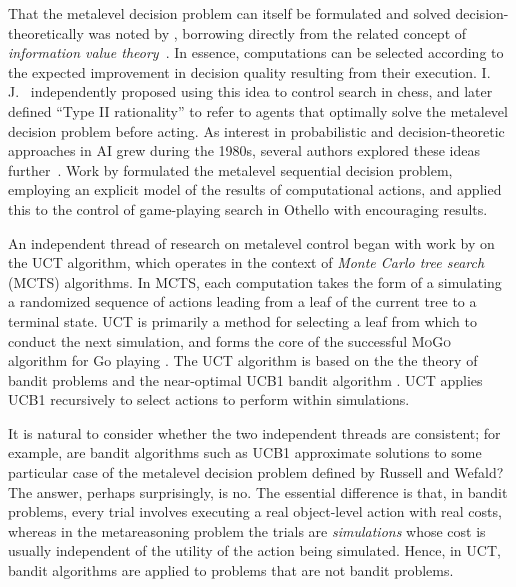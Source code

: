 That the metalevel decision problem can itself be formulated and
solved decision-theoretically was noted by \citet{Matheson:1968},
borrowing directly from the related concept of {\em information value
  theory}~\citep{Howard:1966}. In essence, computations can be
selected according to the expected improvement in decision quality
resulting from their execution. I. J.~\citet{Good:1968} independently
proposed using this idea to control search in chess, and later defined
``Type II rationality'' to refer to agents that optimally solve the
metalevel decision problem before acting. As interest in probabilistic
and decision-theoretic approaches in AI grew during the 1980s, several
authors explored these ideas further~\citep{Dean+Boddy:1988,Doyle:1988,Fehling+Breese:1988,Horvitz:1987b}.
Work by
\citet{Russell+Wefald:1988a,Russell+Wefald:1991a,Russell+Wefald:1991b}
formulated the metalevel sequential decision problem, employing an
explicit model of the results of computational actions, and applied
this to the control of game-playing search in Othello with encouraging
results.

An independent thread of research on metalevel control began with work
by \citet{Kocsis+Szepesvari:2006} on the UCT algorithm, which operates
in the context of {\em Monte Carlo tree search} (MCTS) algorithms.
In MCTS, each computation takes the form
of a simulating a randomized sequence of actions leading from a leaf of the
current tree to a terminal state. UCT is primarily a method for
selecting a leaf from which to conduct the next simulation, and
forms the core of the successful \textsc{MoGo} algorithm for Go 
playing \citep{Gelly+Silver:2011}.  The UCT algorithm is
based on the the theory of bandit problems \citep{Berry+Fristedt:1985} and the near-optimal
UCB1 bandit algorithm \citep{Auer+et+al:2002}. UCT applies
UCB1 recursively to select actions to perform within simulations.

It is natural to consider whether the two independent threads are
consistent; for example, are bandit algorithms such as UCB1 approximate
solutions to some particular case of the metalevel decision problem
defined by Russell and Wefald? The answer, perhaps surprisingly, is no.
The essential difference is that, in bandit problems, every trial involves
executing a real object-level action with real costs, whereas in the metareasoning
problem the trials are {\em simulations} whose cost is usually independent of the
utility of the action being simulated. 
Hence, in UCT, bandit algorithms are applied to problems that are not bandit problems.

